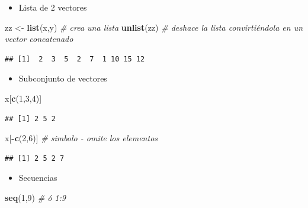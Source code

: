 \documentclass[]{book}
\newenvironment{Shaded}{\begin{snugshade}}{\end{snugshade}}
\newcommand{\KeywordTok}[1]{\textcolor[rgb]{0.13,0.29,0.53}{\textbf{#1}}}
\newcommand{\DecValTok}[1]{\textcolor[rgb]{0.00,0.00,0.81}{#1}}
\newcommand{\StringTok}[1]{\textcolor[rgb]{0.31,0.60,0.02}{#1}}
\newcommand{\CommentTok}[1]{\textcolor[rgb]{0.56,0.35,0.01}{\textit{#1}}}
\newcommand{\OperatorTok}[1]{\textcolor[rgb]{0.81,0.36,0.00}{\textbf{#1}}}
\newcommand{\NormalTok}[1]{#1}
\providecommand{\tightlist}{%
  \setlength{\itemsep}{0pt}\setlength{\parskip}{0pt}}
\begin{document}
\begin{itemize}
\tightlist
\item
  Lista de 2 vectores
\end{itemize}

\begin{Shaded}
\begin{Highlighting}[]
\NormalTok{zz <-}\StringTok{ }\KeywordTok{list}\NormalTok{(x,y) }\CommentTok{# crea una lista}
\KeywordTok{unlist}\NormalTok{(zz) }\CommentTok{# deshace la lista convirtiéndola en un vector concatenado}
\end{Highlighting}
\end{Shaded}

\begin{verbatim}
## [1]  2  3  5  2  7  1 10 15 12
\end{verbatim}

\begin{itemize}
\tightlist
\item
  Subconjunto de vectores
\end{itemize}

\begin{Shaded}
\begin{Highlighting}[]
\NormalTok{x[}\KeywordTok{c}\NormalTok{(}\DecValTok{1}\NormalTok{,}\DecValTok{3}\NormalTok{,}\DecValTok{4}\NormalTok{)]}
\end{Highlighting}
\end{Shaded}

\begin{verbatim}
## [1] 2 5 2
\end{verbatim}

\begin{Shaded}
\begin{Highlighting}[]
\NormalTok{x[}\OperatorTok{-}\KeywordTok{c}\NormalTok{(}\DecValTok{2}\NormalTok{,}\DecValTok{6}\NormalTok{)] }\CommentTok{# simbolo - omite los elementos }
\end{Highlighting}
\end{Shaded}

\begin{verbatim}
## [1] 2 5 2 7
\end{verbatim}

\begin{itemize}
\tightlist
\item
  Secuencias
\end{itemize}

\begin{Shaded}
\begin{Highlighting}[]
\KeywordTok{seq}\NormalTok{(}\DecValTok{1}\NormalTok{,}\DecValTok{9}\NormalTok{) }\CommentTok{# ó 1:9}
\end{Highlighting}
\end{Shaded}
\end{document}
